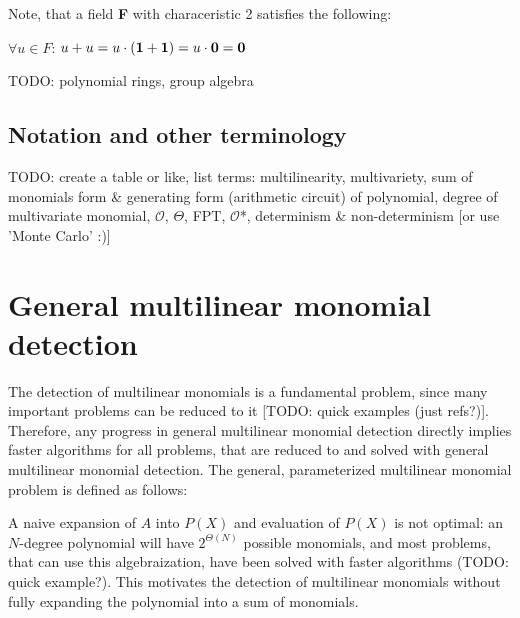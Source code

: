 Note, that a field \textbf F with characeristic 2 satisfies the following:
\begin{center}
  $\forall u \in F$: $u + u = u \cdot (\textbf 1 + \textbf 1) = u \cdot \textbf 0 = \textbf 0$
\end{center}

TODO: polynomial rings, group algebra

\subsection{Notation and other terminology} %

TODO: create a table or like, list terms: 
multilinearity, multivariety, sum of monomials form \& generating form (arithmetic circuit) of polynomial, 
degree of multivariate monomial, $\mathcal{O}$, $\Theta$, FPT, $\mathcal{O}$*, determinism \& non-determinism [or use 'Monte Carlo' :)]

\section{General multilinear monomial detection}

The detection of multilinear monomials is a fundamental problem, 
since many important problems can be reduced to it [TODO: quick examples (just refs?)]. 
Therefore, any progress in general multilinear monomial detection directly implies 
faster algorithms for all problems, that are reduced to and solved with general multilinear monomial detection. 
The general, parameterized multilinear monomial problem is defined as follows: 

\begin{problem}
\end{problem}

A naive expansion of $A$ into $P(X)$ and evaluation of $P(X)$ is not optimal: 
an $N$-degree polynomial will have $2^{\Theta(N)}$ possible monomials, and most 
problems, that can use this algebraization, have been solved with faster algorithms (TODO: quick example?). 
This motivates the detection of multilinear monomials without fully expanding the polynomial into a sum of monomials.\nl

